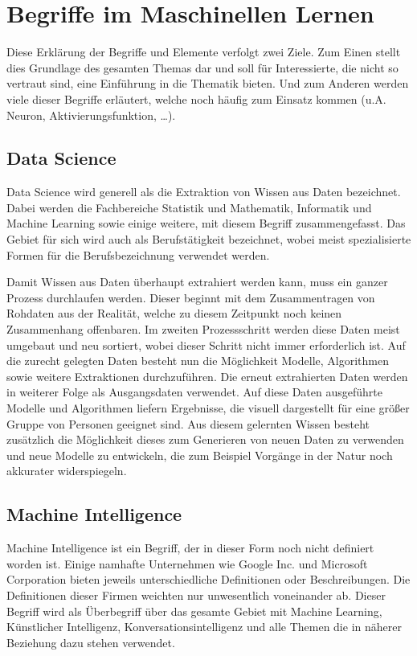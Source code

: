 \chapter{Begriffe im Maschinellen Lernen}
\label{cha:Begriffe}

Diese Erklärung der Begriffe und Elemente verfolgt zwei Ziele.
Zum Einen stellt dies Grundlage des gesamten Themas dar und soll für Interessierte, die nicht so vertraut sind, eine Einführung in die Thematik bieten. 
Und zum Anderen werden viele dieser Begriffe erläutert, welche noch häufig zum Einsatz kommen (u.A. Neuron, Aktivierungsfunktion, …).

\section{Data Science}

Data Science wird generell als die Extraktion von Wissen aus Daten bezeichnet. 
Dabei werden die Fachbereiche Statistik und Mathematik, Informatik und Machine Learning sowie einige weitere, mit diesem Begriff zusammengefasst. 
Das Gebiet für sich wird auch als Berufstätigkeit bezeichnet, wobei meist spezialisierte Formen für die Berufsbezeichnung verwendet werden. \newline

\noindent 
Damit Wissen aus Daten überhaupt extrahiert werden kann, muss ein ganzer Prozess durchlaufen werden. 
Dieser beginnt mit dem Zusammentragen von Rohdaten aus der Realität, welche zu diesem Zeitpunkt noch keinen Zusammenhang offenbaren. 
Im zweiten Prozessschritt werden diese Daten meist umgebaut und neu sortiert, wobei dieser Schritt nicht immer erforderlich ist. 
Auf die zurecht gelegten Daten besteht nun die Möglichkeit Modelle, Algorithmen sowie weitere Extraktionen durchzuführen. 
Die erneut extrahierten Daten werden in weiterer Folge als Ausgangsdaten verwendet. 
Auf diese Daten ausgeführte Modelle und Algorithmen liefern Ergebnisse, die visuell dargestellt für eine größer Gruppe von Personen geeignet sind. 
Aus diesem gelernten Wissen besteht zusätzlich die Möglichkeit dieses zum Generieren von neuen Daten zu verwenden und neue Modelle zu entwickeln, die zum Beispiel Vorgänge in der Natur noch akkurater widerspiegeln.

\section{Machine Intelligence}

Machine Intelligence ist ein Begriff, der in dieser Form noch nicht definiert worden ist. 
Einige namhafte Unternehmen wie Google Inc. und Microsoft Corporation bieten jeweils unterschiedliche Definitionen oder Beschreibungen. 
Die Definitionen dieser Firmen weichten nur unwesentlich voneinander ab.
Dieser Begriff wird als Überbegriff über das gesamte Gebiet mit Machine Learning, Künstlicher Intelligenz, Konversationsintelligenz und alle Themen die in näherer Beziehung dazu stehen verwendet. 

